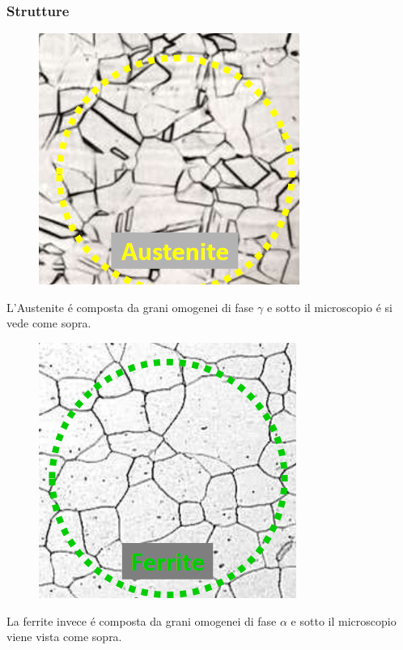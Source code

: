 \documentclass{article}
\begin{document}
{            \subsubsection{Strutture}
                \begin{figure}[h!]
                    \centering
                    \includegraphics[width=.65\linewidth]{L14 - Austenite.png}
                \end{figure}
                L'Austenite \'e composta da grani omogenei di fase $\gamma$ e sotto il microscopio \'e si vede come sopra.\\\newpage
                \begin{figure}[h!]
                    \centering
                    \includegraphics[width=.65\linewidth]{L14 - Ferrite.png}
                \end{figure}
                La ferrite invece \'e composta da grani omogenei di fase $\alpha$ e sotto il microscopio viene vista come sopra.\\
}
\end{document}
